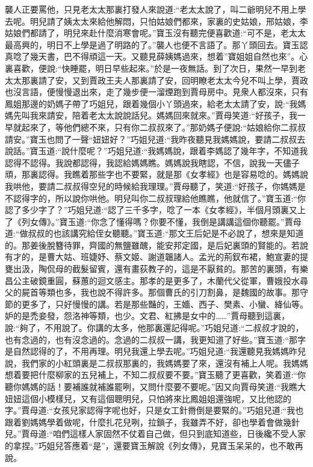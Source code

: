 \begin{parag}
    襲人正要罵他，只見老太太那裏打發人來說道:“老太太說了，叫二爺明兒不用上學去呢。明兒請了姨太太來給他解悶，只怕姑娘們都來，家裏的史姑娘，邢姑娘，李姑娘們都請了，明兒來赴什麼消寒會呢。”寶玉沒有聽完便喜歡道:“可不是，老太太最高興的，明日不上學是過了明路的了。”襲人也便不言語了。那丫頭回去。寶玉認真唸了幾天書，巴不得頑這一天。又聽見薛姨媽過來，想着”寶姐姐自然也來”。心裏喜歡，便說:“快睡罷，明日早些起來。”於是一夜無話。到了次日，果然一早到老太太那裏請了安，又到賈政王夫人那裏請了安，回明瞭老太太今兒不叫上學，賈政也沒言語，便慢慢退出來，走了幾步便一溜煙跑到賈母房中。見衆人都沒來，只有鳳姐那邊的奶媽子帶了巧姐兒，跟着幾個小丫頭過來，給老太太請了安，說:“我媽媽先叫我來請安，陪着老太太說說話兒。媽媽回來就來。”賈母笑道:“好孩子，我一早就起來了，等他們總不來，只有你二叔叔來了。”那奶媽子便說:“姑娘給你二叔叔請安。”寶玉也問了一聲“妞妞好？”巧姐兒道:“我昨夜聽見我媽媽說，要請二叔叔去說話。”寶玉道:“說什麼呢？”巧姐兒道:“我媽媽說，跟着李媽認了幾年字，不知道我認得不認得。我說都認得，我認給媽媽瞧。媽媽說我瞎認，不信，說我一天儘子頑，那裏認得。我瞧着那些字也不要緊，就是那《女孝經》也是容易唸的。媽媽說我哄他，要請二叔叔得空兒的時候給我理理。”賈母聽了，笑道:“好孩子，你媽媽是不認得字的，所以說你哄他。明兒叫你二叔叔理給他瞧瞧，他就信了。”寶玉道:“你認了多少字了？”巧姐兒道:“認了三千多字，唸了一本《女孝經》，半個月頭裏又上了《列女傳》。”寶玉道:“你念了懂得嗎？你要不懂，我倒是講講這個你聽罷。”賈母道:“做叔叔的也該講究給侄女聽聽。”寶玉道:“那文王后妃是不必說了，想來是知道的。那姜後脫簪待罪，齊國的無鹽雖醜，能安邦定國，是后妃裏頭的賢能的。若說有才的，是曹大姑、班婕妤、蔡文姬、謝道韞諸人。孟光的荊釵布裙，鮑宣妻的提甕出汲，陶侃母的截髮留賓，還有畫荻教子的，這是不厭貧的。那苦的裏頭，有樂昌公主破鏡重圓，蘇蕙的迴文感主。那孝的是更多了，木蘭代父從軍，曹娥投水尋父的屍首等類也多，我也說不得許多。那個曹氏的引刀割鼻，是魏國的故事。那守節的更多了，只好慢慢的講。若是那些豔的，王嬙、西子、樊素、小蠻、絳仙等。妒的是禿妾發，怨洛神等類，也少。文君、紅拂是女中的……”賈母聽到這裏，說:“夠了，不用說了。你講的太多，他那裏還記得呢。”巧姐兒道:“二叔叔才說的，也有念過的，也有沒念過的。念過的二叔叔一講，我更知道了好些。”寶玉道:“那字是自然認得的了，不用再理。明兒我還上學去呢。”巧姐兒道:“我還聽見我媽媽昨兒說，我們家的小紅頭裏是二叔叔那裏的，我媽媽要了來，還沒有補上人呢。我媽媽想着要把什麼柳家的五兒補上，不知二叔叔要不要。”寶玉聽了更喜歡，笑着道:“你聽你媽媽的話！要補誰就補誰罷咧，又問什麼要不要呢。”因又向賈母笑道:“我瞧大妞妞這個小模樣兒，又有這個聰明兒，只怕將來比鳳姐姐還強呢，又比他認的字。”賈母道:“女孩兒家認得字呢也好，只是女工針黹倒是要緊的。”巧姐兒道:“我也跟着劉媽媽學着做呢，什麼扎花兒咧，拉鎖子，我雖弄不好，卻也學着會做幾針兒。”賈母道:“咱們這樣人家固然不仗着自己做，但只到底知道些，日後纔不受人家的拿捏。”巧姐兒答應着“是”，還要寶玉解說《列女傳》，見寶玉呆呆的，也不敢再說。
\end{parag}


